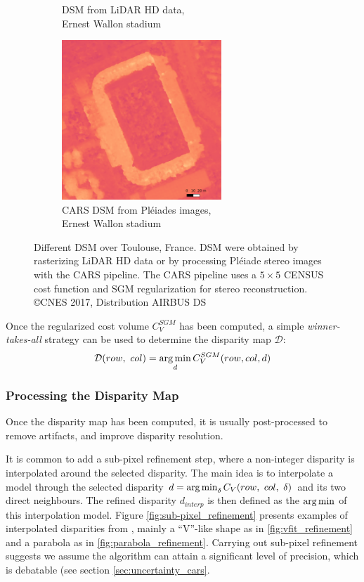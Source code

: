 \begin{figure}
\begin{subfigure}[t]{0.5\linewidth}
        \caption{DSM from LiDAR HD data,\\Ernest Wallon stadium}
        \label{fig:DSM_ernest_wallon_lidar}
    \end{subfigure}\hfill
    \begin{subfigure}[t]{0.5\linewidth}
        \centering
        \includegraphics[height=6cm]{Images/Chap_1/DSM_Wallon_CARS.png}
        \caption{CARS DSM from Pléiades images,\\Ernest Wallon stadium}
        \label{fig:DSM_ernest_wallon_cars}
    \end{subfigure}
    \caption{Different DSM over Toulouse, France. DSM were obtained by rasterizing LiDAR HD data or by processing Pléiade stereo images with the CARS pipeline. The CARS pipeline uses a $5\times5$ CENSUS cost function and SGM regularization for stereo reconstruction. \copyright CNES 2017, Distribution AIRBUS DS}
    \label{fig:DSM_toulouse}
\end{figure}


Once the regularized cost volume $C_V^{SGM}$ has been computed, a simple \textit{winner-takes-all} strategy can be used to determine the disparity map $\mathcal{D}$:
\begin{align}
    \mathcal{D}(row, ~col) = \operatorname*{arg\,min}_d C_V^{SGM}(row, col, d) 
\end{align}

\subsubsection{Processing the Disparity Map}\label{sec:postprocess_disparity}
Once the disparity map has been computed, it is usually post-processed to remove artifacts, and improve disparity resolution.

It is common to add a sub-pixel refinement step, where a non-integer disparity is interpolated around the selected disparity. The main idea is to interpolate a model through the selected disparity $d=\operatorname*{arg\,min}_\delta C_V(row, ~col, ~\delta)$ and its two direct neighbours. The refined disparity $d_{interp}$ is then defined as the $\operatorname*{arg\,min}$ of this interpolation model. Figure \ref{fig:sub-pixel_refinement} presents examples of interpolated disparities from  \cite{haller_real-time_2010}, mainly a ``V''-like shape as in \ref{fig:vfit_refinement} and a parabola as in \ref{fig:parabola_refinement}. Carrying out sub-pixel refinement suggests we assume the algorithm can attain a significant level of precision, which is debatable (see section \ref{sec:uncertainty_cars}.


